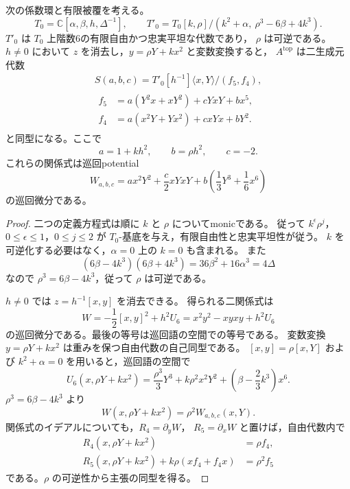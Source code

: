 \begin{lemma}\label{lem:degree-one-stephenson-normal-form}
次の係数環と有限被覆を考える。
\[
 T_0=\mathbb C[\alpha,\beta,h,\Delta^{-1}],\qquad
 T'_0=T_0[k,\rho]/(k^2+\alpha,\ \rho^3-6\beta+4k^3).
\]
$T'_0$ は $T_0$ 上階数6の有限自由かつ忠実平坦な代数であり，
$\rho$ は可逆である。
$h\ne0$ において $z$ を消去し，$y=\rho Y+kx^2$ と変数変換すると，
$A^{\mathrm{top}}$ は二生成元代数
\begin{equation}\label{eq:degree-one-stephenson-relations}
 \begin{gathered}
 S(a,b,c)=T'_0[h^{-1}]\langle x,Y\rangle/(f_5,f_4),\\
 \begin{aligned}
 f_5&=a(Y^2x+xY^2)+cYxY+bx^5,\\
 f_4&=a(x^2Y+Yx^2)+cxYx+bY^2.
 \end{aligned}
 \end{gathered}
\end{equation}
と同型になる。ここで
\[
 a=1+kh^2,\qquad b=\rho h^2,\qquad c=-2.
\]
これらの関係式は巡回potential
\[
 W_{a,b,c}=a x^2Y^2+\frac c2xYxY+
             b\left(\frac13Y^3+\frac16x^6\right)
\]
の巡回微分である。
\end{lemma}
\begin{proof}
二つの定義方程式は順に $k$ と $\rho$ についてmonicである。
従って $k^\epsilon\rho^j$，$0\le\epsilon\le1$，$0\le j\le2$ が
$T_0$-基底を与え，有限自由性と忠実平坦性が従う。
$k$ を可逆化する必要はなく，$\alpha=0$ 上の $k=0$ も含まれる。
また
\begin{equation}\label{eq:degree-one-cover-unit}
 (6\beta-4k^3)(6\beta+4k^3)
   =36\beta^2+16\alpha^3=4\Delta
\end{equation}
なので $\rho^3=6\beta-4k^3$，従って $\rho$ は可逆である。

$h\ne0$ では $z=h^{-1}[x,y]$ を消去できる。
得られる二関係式は
\[
 W=-\frac12[x,y]^2+h^2U_6
   =x^2y^2-xyxy+h^2U_6
\]
の巡回微分である。最後の等号は巡回語の空間での等号である。
変数変換 $y=\rho Y+kx^2$ は重みを保つ自由代数の自己同型である。
$[x,y]=\rho[x,Y]$ および $k^2+\alpha=0$ を用いると，巡回語の空間で
\[
 U_6(x,\rho Y+kx^2)
  =\frac{\rho^3}{3}Y^3+k\rho^2x^2Y^2+
       \left(\beta-\frac23k^3\right)x^6.
\]
$\rho^3=6\beta-4k^3$ より
\begin{equation}\label{eq:degree-one-potential-normal-form}
 W(x,\rho Y+kx^2)=\rho^2W_{a,b,c}(x,Y).
\end{equation}
関係式のイデアルについても，$R_4=\partial_yW$，
$R_5=\partial_xW$ と置けば，自由代数内で
\[
 \begin{split}
 R_4(x,\rho Y+kx^2)&=\rho f_4,\\
 R_5(x,\rho Y+kx^2)+k\rho(xf_4+f_4x)&=\rho^2f_5
 \end{split}
\]
である。$\rho$ の可逆性から主張の同型を得る。
\end{proof}

